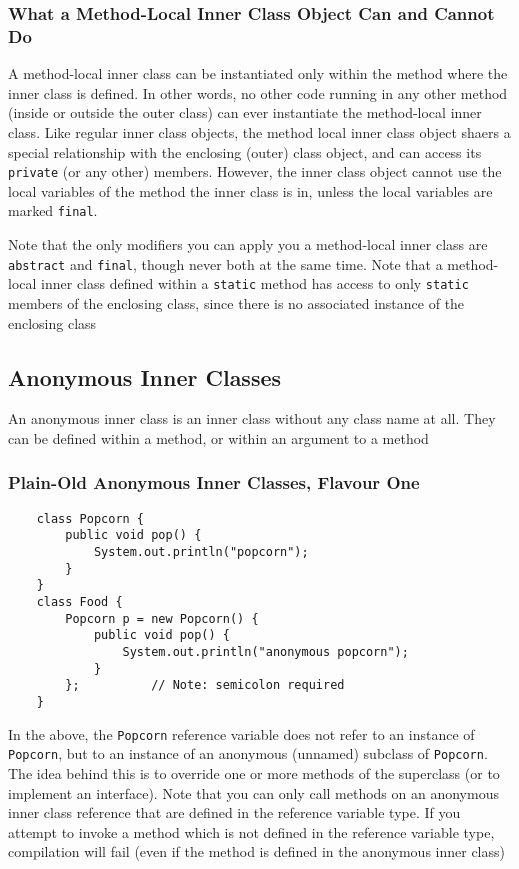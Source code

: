 \subsubsection{What a Method-Local Inner Class Object Can and Cannot Do}
A method-local inner class can be instantiated only within the method where the 
inner class is defined. In other words, no other code running in any other 
method (inside or outside the outer class) can ever instantiate the 
method-local inner class. Like regular inner class objects, the method local 
inner class object shaers a special relationship with the enclosing (outer) 
class object, and can access its \verb#private# (or any other) members.  
However, the inner class object cannot use the local variables of the method 
the inner class is in, unless the local variables are marked \verb#final#.

Note that the only modifiers you can apply you a method-local inner class are 
\verb#abstract# and \verb#final#, though never both at the same time. Note that 
a method-local inner class defined within a \verb#static# method has access to 
only \verb#static# members of the enclosing class, since there is no associated 
instance of the enclosing class

\subsection{Anonymous Inner Classes}
An anonymous inner class is an inner class without any class name at all. They 
can be defined within a method, or within an argument to a method

\subsubsection{Plain-Old Anonymous Inner Classes, Flavour One}
\begin{verbatim}
    class Popcorn {
        public void pop() {
            System.out.println("popcorn");
        }
    }
    class Food {
        Popcorn p = new Popcorn() {
            public void pop() {
                System.out.println("anonymous popcorn");
            }
        };          // Note: semicolon required
    }
\end{verbatim}
In the above, the \verb#Popcorn# reference variable does not refer to an 
instance of \verb#Popcorn#, but to an instance of an anonymous (unnamed) 
subclass of \verb#Popcorn#. The idea behind this is to override one or more 
methods of the superclass (or to implement an interface). Note that you can 
only call methods on an anonymous inner class reference that are defined in the 
reference variable type. If you attempt to invoke a method which is not defined 
in the reference variable type, compilation will fail (even if the method is 
defined in the anonymous inner class)

